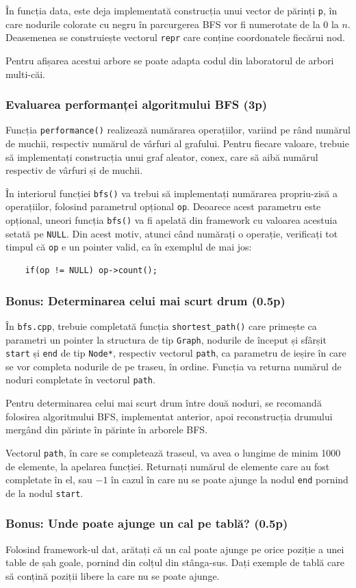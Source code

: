 \documentclass[../ro-fa-lab.tex]{subfiles}
\begin{document}
În funcția data, este deja implementată construcția unui vector de părinți \texttt{p}, în care nodurile colorate cu negru în parcurgerea BFS vor fi numerotate de la $0$ la $n$. Deasemenea se construiește vectorul \texttt{repr} care conține coordonatele fiecărui nod. 

Pentru afișarea acestui arbore se poate adapta codul din laboratorul de arbori multi-căi.

\subsubsection{Evaluarea performanței algoritmului BFS (3p)}
Funcția \texttt{performance()} realizează numărarea operațiilor, variind pe rând numărul de muchii, respectiv numărul de vârfuri al grafului. Pentru fiecare valoare, trebuie să implementați construcția unui graf aleator, conex, care să aibă numărul respectiv de vârfuri și de muchii.

În interiorul funcției \texttt{bfs()} va trebui să implementați numărarea propriu-zisă a operațiilor, folosind parametrul opțional \texttt{op}. Deoarece acest parametru este opțional, uneori funcția \texttt{bfs()} va fi apelată din framework cu valoarea acestuia setată pe \texttt{NULL}. Din acest motiv, atunci când numărați o operație, verificați tot timpul că \texttt{op} e un pointer valid, ca în exemplul de mai jos:
\begin{verbatim}
    if(op != NULL) op->count();
\end{verbatim}

\subsubsection{Bonus: Determinarea celui mai scurt drum (0.5p)}
În \texttt{bfs.cpp}, trebuie completată funcția \texttt{shortest\_path()} care primește ca parametri un pointer la structura de tip \texttt{Graph}, nodurile de început și sfârșit \texttt{start} și \texttt{end} de tip \texttt{Node*}, respectiv vectorul \texttt{path}, ca parametru de ieșire în care se vor completa nodurile de pe traseu, în ordine. Funcția va returna numărul de noduri completate în vectorul \texttt{path}.

Pentru determinarea celui mai scurt drum între două noduri, se recomandă folosirea algoritmului BFS, implementat anterior, apoi reconstrucția drumului mergând din părinte în părinte în arborele BFS.

Vectorul \texttt{path}, în care se completează traseul, va avea o lungime de minim 1000 de elemente, la apelarea funcției. Returnați numărul de elemente care au fost completate în el, sau $-1$ în cazul în care nu se poate ajunge la nodul \texttt{end} pornind de la nodul \texttt{start}.

\subsubsection{Bonus: Unde poate ajunge un cal pe tablă? (0.5p)}
Folosind framework-ul dat, arătați că un cal poate ajunge pe orice poziție a unei table de șah goale, pornind din colțul din stânga-sus. Dați exemple de tablă care să conțină poziții libere la care nu se poate ajunge.
\end{document}
